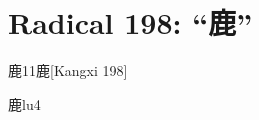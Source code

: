 
\section*{Radical 198: ``⿅''}

\begin{entry}{鹿}{11}{⿅}[Kangxi 198]
  \begin{phonetics}{鹿}{lu4}
  \end{phonetics}
\end{entry}


